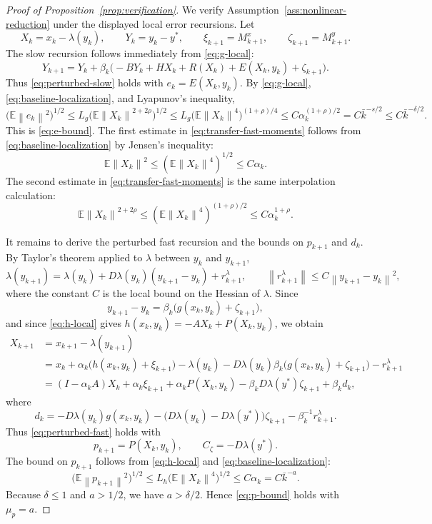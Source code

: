 \documentclass{article}
\newcommand{\E}{\mathbb{E}}
\newcommand{\norm}[1]{\left\lVert #1\right\rVert}
\begin{document}
\begin{proof}[Proof of Proposition~\ref{prop:verification}]
We verify Assumption~\ref{ass:nonlinear-reduction} under the displayed local error recursions. Let
\[
  X_k=x_k-\lambda(y_k),
  \qquad
  Y_k=y_k-y^*,
  \qquad
  \xi_{k+1}=M^x_{k+1},
  \qquad
  \zeta_{k+1}=M^y_{k+1}.
\]
The slow recursion follows immediately from \eqref{eq:g-local}:
\[
  Y_{k+1}
  =Y_k+\beta_k\big(-BY_k+HX_k+R(X_k)+E(X_k,y_k)+\zeta_{k+1}\big).
\]
Thus \eqref{eq:perturbed-slow} holds with $e_k=E(X_k,y_k)$. By \eqref{eq:g-local}, \eqref{eq:baseline-localization}, and Lyapunov's inequality,
\[
  \big(\E\norm{e_k}^2\big)^{1/2}
  \le L_g\big(\E\norm{X_k}^{2+2\rho}\big)^{1/2}
  \le L_g\big(\E\norm{X_k}^4\big)^{(1+\rho)/4}
  \le C\alpha_k^{(1+\rho)/2}
  =C\bar k^{-s/2}
  \le C\bar k^{-\delta/2}.
\]
This is \eqref{eq:e-bound}. The first estimate in \eqref{eq:transfer-fast-moments} follows from \eqref{eq:baseline-localization} by Jensen's inequality:
\[
  \E\norm{X_k}^2\le (\E\norm{X_k}^4)^{1/2}\le C\alpha_k.
\]
The second estimate in \eqref{eq:transfer-fast-moments} is the same interpolation calculation:
\[
  \E\norm{X_k}^{2+2\rho}
  \le (\E\norm{X_k}^4)^{(1+\rho)/2}
  \le C\alpha_k^{1+\rho}.
\]

It remains to derive the perturbed fast recursion and the bounds on $p_{k+1}$ and $d_k$. By Taylor's theorem applied to $\lambda$ between $y_k$ and $y_{k+1}$,
\begin{equation}
  \lambda(y_{k+1})
  =\lambda(y_k)+D\lambda(y_k)(y_{k+1}-y_k)+r^\lambda_{k+1},
  \qquad
  \norm{r^\lambda_{k+1}}\le C\norm{y_{k+1}-y_k}^2, \label{eq:lambda-taylor}
\end{equation}
where the constant $C$ is the local bound on the Hessian of $\lambda$. Since
\[
  y_{k+1}-y_k=\beta_k\big(g(x_k,y_k)+\zeta_{k+1}\big),
\]
and since \eqref{eq:h-local} gives $h(x_k,y_k)=-AX_k+P(X_k,y_k)$, we obtain
\begin{align*}
  X_{k+1}
  &=x_{k+1}-\lambda(y_{k+1})\\
  &=x_k+\alpha_k\big(h(x_k,y_k)+\xi_{k+1}\big)
    -\lambda(y_k)-D\lambda(y_k)\beta_k\big(g(x_k,y_k)+\zeta_{k+1}\big)-r^\lambda_{k+1}\\
  &=(I-\alpha_kA)X_k+\alpha_k\xi_{k+1}+\alpha_kP(X_k,y_k)
    -\beta_kD\lambda(y^*)\zeta_{k+1}+\beta_k d_k,
\end{align*}
where
\begin{equation}
  d_k
  =-D\lambda(y_k)g(x_k,y_k)
   -\big(D\lambda(y_k)-D\lambda(y^*)\big)\zeta_{k+1}
   -\beta_k^{-1}r^\lambda_{k+1}. \label{eq:d-verification-def}
\end{equation}
Thus \eqref{eq:perturbed-fast} holds with
\[
  p_{k+1}=P(X_k,y_k),
  \qquad
  C_\zeta=-D\lambda(y^*).
\]
The bound on $p_{k+1}$ follows from \eqref{eq:h-local} and \eqref{eq:baseline-localization}:
\[
  \big(\E\norm{p_{k+1}}^2\big)^{1/2}
  \le L_h\big(\E\norm{X_k}^4\big)^{1/2}
  \le C\alpha_k
  =C\bar k^{-a}.
\]
Because $\delta\le1$ and $a>1/2$, we have $a>\delta/2$. Hence \eqref{eq:p-bound} holds with $\mu_p=a$.


\end{proof}
\end{document}
